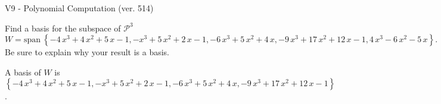 \begin{exercise}
  \begin{exerciseTitle}V9 - Polynomial Computation (ver. 514)\end{exerciseTitle}
  \begin{exerciseStatement}
    Find a basis for the subspace of \(\mathcal{P}^3\) 
\[W=\mathrm{span}\ \left\{-4 \, x^{3} + 4 \, x^{2} + 5 \, x - 1 , -x^{3} + 5 \, x^{2} + 2 \, x - 1 , -6 \, x^{3} + 5 \, x^{2} + 4 \, x , -9 \, x^{3} + 17 \, x^{2} + 12 \, x - 1 , 4 \, x^{3} - 6 \, x^{2} - 5 \, x\right\}.\]
 Be sure to explain why your result is a basis.


  \end{exerciseStatement}
  \begin{exerciseAnswer}
   A basis of \(W\) is  \(\left\{-4 \, x^{3} + 4 \, x^{2} + 5 \, x - 1 , -x^{3} + 5 \, x^{2} + 2 \, x - 1 , -6 \, x^{3} + 5 \, x^{2} + 4 \, x , -9 \, x^{3} + 17 \, x^{2} + 12 \, x - 1\right\}\).
  


  \end{exerciseAnswer}
\end{exercise}